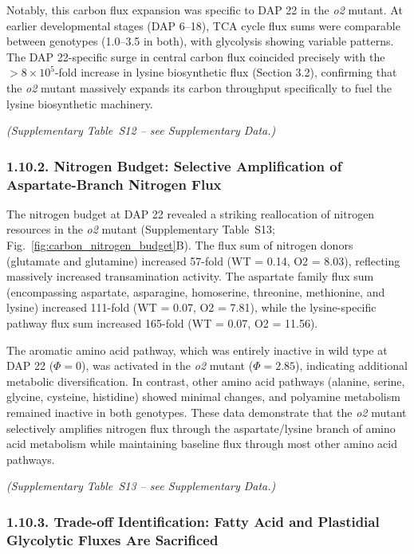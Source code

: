\documentclass[12pt,a4paper]{article}
\begin{document}
Notably, this carbon flux expansion was specific to DAP 22 in the \textit{o2} mutant. At earlier developmental stages (DAP 6--18), TCA cycle flux sums were comparable between genotypes (1.0--3.5 in both), with glycolysis showing variable patterns. The DAP 22-specific surge in central carbon flux coincided precisely with the $>8 \times 10^{5}$-fold increase in lysine biosynthetic flux (Section 3.2), confirming that the \textit{o2} mutant massively expands its carbon throughput specifically to fuel the lysine biosynthetic machinery.


\noindent\textit{(Supplementary Table~S12 -- see Supplementary Data.)}


\subsubsection{1.10.2. Nitrogen Budget: Selective Amplification of Aspartate-Branch Nitrogen Flux}

The nitrogen budget at DAP 22 revealed a striking reallocation of nitrogen resources in the \textit{o2} mutant (Supplementary Table~S13; Fig.~\ref{fig:carbon_nitrogen_budget}B). The flux sum of nitrogen donors (glutamate and glutamine) increased 57-fold (WT = 0.14, O2 = 8.03), reflecting massively increased transamination activity. The aspartate family flux sum (encompassing aspartate, asparagine, homoserine, threonine, methionine, and lysine) increased 111-fold (WT = 0.07, O2 = 7.81), while the lysine-specific pathway flux sum increased 165-fold (WT = 0.07, O2 = 11.56).

The aromatic amino acid pathway, which was entirely inactive in wild type at DAP 22 ($\Phi = 0$), was activated in the \textit{o2} mutant ($\Phi = 2.85$), indicating additional metabolic diversification. In contrast, other amino acid pathways (alanine, serine, glycine, cysteine, histidine) showed minimal changes, and polyamine metabolism remained inactive in both genotypes. These data demonstrate that the \textit{o2} mutant selectively amplifies nitrogen flux through the aspartate/lysine branch of amino acid metabolism while maintaining baseline flux through most other amino acid pathways.


\noindent\textit{(Supplementary Table~S13 -- see Supplementary Data.)}


\subsubsection{1.10.3. Trade-off Identification: Fatty Acid and Plastidial Glycolytic Fluxes Are Sacrificed}
\end{document}
